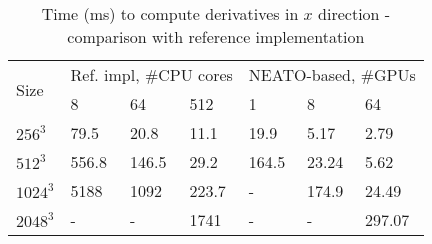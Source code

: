 \begin{table}[]
\centering
\caption{Time (ms) to compute derivatives in $x$ direction - comparison with reference implementation \cite{mohd2010adapting}}
\label{table:compact-refimpl-timings}
\begin{tabular}{|l|l|l|l|l|l|l|}
\hline
\multirow{2}{*}{Size} & \multicolumn{3}{c|}{Ref. impl, \#CPU cores} & \multicolumn{3}{c|}{NEATO-based, \#GPUs} \\ \cline{2-7}
         & 8         & 64        & 512      & 1       & 8       & 64      \\ \hline
$256^3$  & 79.5      & 20.8      & 11.1     & 19.9    & 5.17    & 2.79    \\ \hline
$512^3$  & 556.8     & 146.5     & 29.2     & 164.5   & 23.24   & 5.62    \\ \hline
$1024^3$ & 5188      & 1092      & 223.7    & -       & 174.9   & 24.49   \\ \hline
$2048^3$ & -         & -         & 1741     & -       & -       & 297.07  \\ \hline
\end{tabular}
\end{table}
